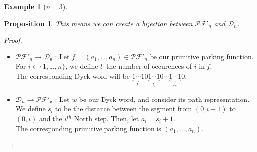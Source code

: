 \documentclass[12pt]{report}
\newtheorem*{prop}{Proposition}
\newtheorem*{example}{Example}
\begin{document}
\begin{example}[$n = 3$]
\begin{center}
    \end{center}
\end{example}

\begin{prop}
    This means we can create a \emph{bijection} between
    $\mathcal{PF'}_n$ and $\mathcal{D}_n$.
\end{prop}

\begin{proof}
    ~\
\begin{itemize}
    \item $\mathcal{PF'}_n \to \mathcal{D}_n$ :
    Let $f = (a_1, \ldots, a_n) \in \mathcal{PF'}_n$
    be our primitive parking function.
    For $i \in \{1, \ldots, n\}$, we define $l_i$ the
    number of occurences of $i$ in $f$.\\
    The corresponding Dyck word will be
    $\underbrace{1 \cdots 1}_{l_1}0
     \underbrace{1 \cdots 1}_{l_2}0 \cdots
     \underbrace{1 \cdots 1}_{l_n}0$.
    
    \item $\mathcal{D}_n \to \mathcal{PF'}_n$ :
    Let $w$ be our Dyck word, and consider its path
    representation. We define $s_i$ to be the distance
    between the segment from $(0, i - 1)$ to $(0, i)$
    and the $i^{th}$ North step. Then, let $a_i = s_i + 1$.\\
    The corresponding primitive parking function is 
    $(a_1, \ldots, a_n)$.
\end{itemize}
\end{proof}
\end{document}
